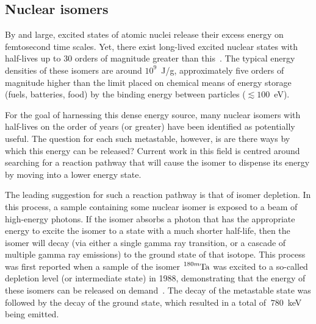 \documentclass[12pt,a4paper]{article}
\begin{document}

\subsection*{Nuclear isomers}

\medskip
By and large, excited states of atomic nuclei release their excess energy on femtosecond time scales. Yet, there exist long-lived excited nuclear states with half-lives up to 30 orders of magnitude greater than this~\cite{shaffer_innovations_2018}. The typical energy densities of these isomers are around $10^9$~J/g, approximately five orders of magnitude higher than the limit placed on chemical means of energy storage (fuels, batteries, food) by the binding energy between particles ($\lesssim 100$~eV).

\medskip
For the goal of harnessing this dense energy source, many nuclear isomers with half-lives on the order of years (or greater) have been identified as potentially useful. The question for each such metastable, however, is are there ways by which this energy can be released? Current work in this field is centred around searching for a reaction pathway that will cause the isomer to dispense its energy by moving into a lower energy state.

\medskip
The leading suggestion for such a reaction pathway is that of isomer depletion. In this process, a sample containing some nuclear isomer is exposed to a beam of high-energy photons. If the isomer absorbs a photon that has the appropriate energy to excite the isomer to a state with a much shorter half-life, then the isomer will decay (via either a single gamma ray transition, or a cascade of multiple gamma ray emissions) to the ground state of that isotope. This process was first reported when a sample of the isomer $\ce{^{180m}Ta}$ was excited to a so-called depletion level (or intermediate state) in 1988, demonstrating that the energy of these isomers can be released on demand~\cite{collins_depopulation_1988}. The decay of the metastable state was followed by the decay of the ground state, which resulted in a total of $~780$~keV being emitted. 
\end{document}
